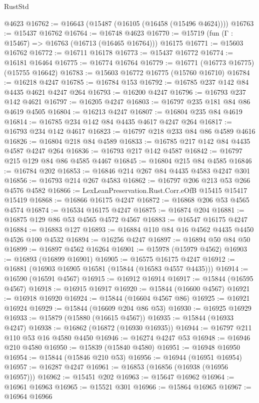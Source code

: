 \begin{lexlean}{RustStd}
\begin{coremodule}
    @4623
@16762 := @16643 (@15487 (@16105 (@16458 (@15496 @4624))))
@16763 := @15437 @16762
@16764 := @16748 @4623
@16770 := @15719 (fun (Γ : @15467) => @16763 (@16713 (@16465 @16764))) @16175
@16771 := @15603 @16762
@16772 := @16711 @16178
@16773 := @15437 @16772
@16774 := @16181 @16464
@16775 := @16774 @16764
@16779 := @16771 (@16773 @16775) (@15755 @16642)
@16783 := @15603 @16772 @16775 (@15760 @16710)
@16784 := @16218 @4247
@16785 := @16784 @153
@16792 := @16785 @237 @142 @84 @4435 @4621 @4247 @264
@16793 := @16200 @4247
@16796 := @16793 @237 @142 @4621
@16797 := @16205 @4247
@16803 := @16797 @235 @181 @84 @86 @4619 @4505
@16804 := @16213 @4247
@16807 := @16804 @235 @84 @4619
@16814 := @16785 @234 @142 @84 @4435 @4617 @4247 @264
@16817 := @16793 @234 @142 @4617
@16823 := @16797 @218 @233 @84 @86 @4589 @4616
@16826 := @16804 @218 @84 @4589
@16833 := @16785 @217 @142 @84 @4435 @4587 @4247 @264
@16836 := @16793 @217 @142 @4587
@16842 := @16797 @215 @129 @84 @86 @4585 @4467
@16845 := @16804 @215 @84 @4585
@16846 := @16784 @202
@16853 := @16846 @214 @267 @84 @4435 @4583 @4247 @301
@16856 := @16793 @214 @267 @4583
@16862 := @16797 @206 @213 @53 @266 @4576 @4582
@16866 := LexLeanPreservation.Rust.Corr.eOfB @15415 @15417 @15419
@16868 := @16866 @16175 @4247
@16872 := @16868 @206 @53 @4565 @4574
@16874 := @16534 @16175 @4247
@16875 := @16874 @204
@16881 := @16875 @129 @86 @53 @4565 @4572 @4567
@16883 := @16547 @16175 @4247
@16884 := @16883 @127
@16893 := @16884 @110 @84 @16 @4562 @4435 @4450 @4526 @100 @4532
@16894 := @16256 @4247
@16897 := @16894 @50 @84 @50
@16899 := @16897 @4562 @16264
@16901 := @15978 (@15979 @4562)
@16903 := @16893 (@16899 @16901)
@16905 := @16575 @16175 @4247
@16912 := @16881 (@16903 @16905 @16581 (@15844 (@16583 @4557 @4435)))
@16914 := @16590 (@16591 @4567)
@16915 := @16912 @16914
@16917 := @15844 (@16595 @4567)
@16918 := @16915 @16917
@16920 := @15844 (@16600 @4567)
@16921 := @16918 @16920
@16924 := @15844 (@16604 @4567 @86)
@16925 := @16921 @16924
@16929 := @15844 (@16609 @204 @86 @53)
@16930 := @16925 @16929
@16933 := @15879 (@15880 (@16615 @4567))
@16935 := @15844 (@16933 @4247)
@16938 := @16862 (@16872 (@16930 @16935))
@16944 := @16797 @211 @110 @53 @16 @4580 @4450
@16946 := @16274 @4247 @53
@16948 := @16946 @210 @4580
@16950 := @15839 (@15840 @4580)
@16951 := @16948 @16950
@16954 := @15844 (@15846 @210 @53)
@16956 := @16944 (@16951 @16954)
@16957 := @16287 @4247
@16961 := @16853 (@16856 (@16938 (@16956 @16957)))
@16962 := @15451 @202
@16963 := @15647 @16962
@16964 := @16961 @16963
@16965 := @15521 @301
@16966 := @15864 @16965
@16967 := @16964 @16966

\end{coremodule}
\end{lexlean}
